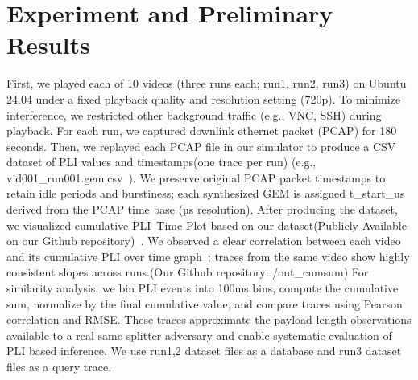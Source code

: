 \documentclass[conference]{IEEEtran}
\begin{document}
\section{Experiment and Preliminary Results}
First, we played each of 10 videos (three runs each; run1, run2, run3) on Ubuntu 24.04 under a fixed playback quality and resolution setting (720p). To minimize interference, we restricted other background traffic (e.g., VNC, SSH) during playback. For each run, we captured downlink ethernet packet (PCAP) for 180 seconds. Then, we replayed each PCAP file in our simulator to produce a CSV dataset of PLI values and timestamps(one trace per run) (e.g., vid001\_run001.gem.csv~\cite{github}). We preserve original PCAP packet timestamps to retain idle periods and burstiness; each synthesized GEM is assigned t\_start\_us derived from the PCAP time base (µs resolution). After producing the dataset, we visualized cumulative PLI--Time Plot based on our dataset(Publicly Available on our Github repository)~\cite{github}. We observed a clear correlation between each video and its cumulative PLI over time graph~\cite{github}; traces from the same video show highly consistent slopes across runs.(Our Github repository: \//out\_cumsum)
For similarity analysis, we bin PLI events into 100ms bins, compute the cumulative sum, normalize by the final cumulative value, and compare traces using Pearson correlation and RMSE.
These traces approximate the payload length observations available to a real same-splitter adversary and enable systematic evaluation of PLI based inference.
We use run1,2 dataset files as a database and run3 dataset files as a query trace.

\end{document}
